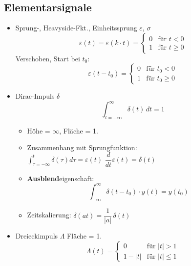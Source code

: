   \subsection{Elementarsignale}
  \begin{mdframed}[style=exercise]
      \begin{itemize}[leftmargin=*]
          \item{Sprung-, Heavyside-Fkt., Einheitssprung $\varepsilon$, $\sigma$}
          \[ \varepsilon(t) = \varepsilon(k\cdot t) = 
             \begin{cases}
                 0 & \text{f\"ur } t < 0\\
                 1 & \text{f\"ur } t \geq 0
             \end{cases}
          \]
Verschoben, Start bei $t_0$:
        \[ \varepsilon(t-t_0) = 
          \begin{cases}
          	0 & \text{f\"ur } t_0 < 0\\
          	1 & \text{f\"ur } t_0 \geq 0
          \end{cases}
          \]
          \item{Dirac-Impuls $\delta$}
          \[
              \int_{t=-\infty}^{\infty} \delta(t) \, dt = 1
          \]
          \begin{itemize}
              \item Höhe = $\infty$, Fläche = 1.
              \item{Zusammenhang mit Sprungfunktion:}\\
                  $\boxed{\int_{\tau=-\infty}^{t}\delta(\tau)d\tau =
                  \varepsilon(t)}$
                  $\boxed{\dfrac{d}{dt}\varepsilon(t) =
                  \delta(t)}$
              \item{\textbf{Ausblend}eigenschaft}:
                  \[
                      \int_{-\infty}^{\infty}\delta(t-t_0)\cdot y(t) = y(t_0)
                  \]
              \item{Zeitskalierung: }
                  $\delta(at)=\dfrac{1}{\lvert a\rvert}\,\delta(t)$
          \end{itemize}
          \item{Dreieckimpuls $\Lambda$}
          Fläche = 1.
          \[ \Lambda(t) =
             \begin{cases}
                 0 & \text{f\"ur } \vert t\rvert > 1\\
                 1-|t| & \text{f\"ur } \vert t\rvert \leq 1
             \end{cases}
          \]

\end{itemize}
\end{mdframed}
